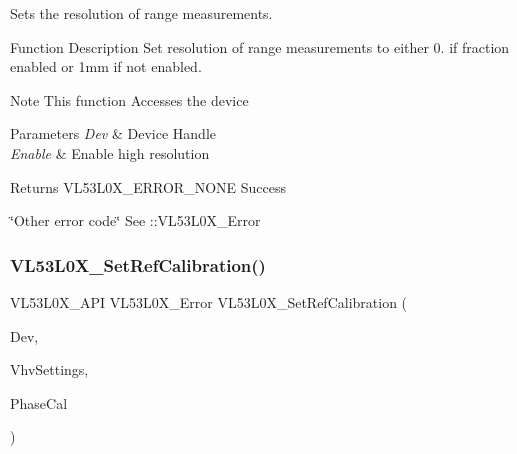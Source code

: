 Sets the resolution of range measurements. 

\begin{DoxyParagraph}{Function Description}
Set resolution of range measurements to either 0.\+25mm if fraction enabled or 1mm if not enabled.
\end{DoxyParagraph}
\begin{DoxyNote}{Note}
This function Accesses the device
\end{DoxyNote}

\begin{DoxyParams}{Parameters}
{\em Dev} & Device Handle \\
\hline
{\em Enable} & Enable high resolution\\
\hline
\end{DoxyParams}
\begin{DoxyReturn}{Returns}
V\+L53\+L0\+X\+\_\+\+E\+R\+R\+O\+R\+\_\+\+N\+O\+NE Success 

\char`\"{}\+Other error code\char`\"{} See \+::\+V\+L53\+L0\+X\+\_\+\+Error 
\end{DoxyReturn}
\mbox{\label{group__VL53L0X__parameters__group_ga83f7b83f76eaed0fdb4ea2034c3a9a21}} 
\subsubsection{\texorpdfstring{V\+L53\+L0\+X\+\_\+\+Set\+Ref\+Calibration()}{VL53L0X\_SetRefCalibration()}}
{\footnotesize\ttfamily V\+L53\+L0\+X\+\_\+\+A\+PI V\+L53\+L0\+X\+\_\+\+Error V\+L53\+L0\+X\+\_\+\+Set\+Ref\+Calibration (\begin{DoxyParamCaption}\item[{\hyperlink{group__VL53L0X__platform__group_ga2d6405308b1dd524b462f1b8fb97d167}{V\+L53\+L0\+X\+\_\+\+D\+EV}}]{Dev,  }\item[{\hyperlink{vl53l0x__types_8h_aba7bc1797add20fe3efdf37ced1182c5}{uint8\+\_\+t}}]{Vhv\+Settings,  }\item[{\hyperlink{vl53l0x__types_8h_aba7bc1797add20fe3efdf37ced1182c5}{uint8\+\_\+t}}]{Phase\+Cal }\end{DoxyParamCaption})}



